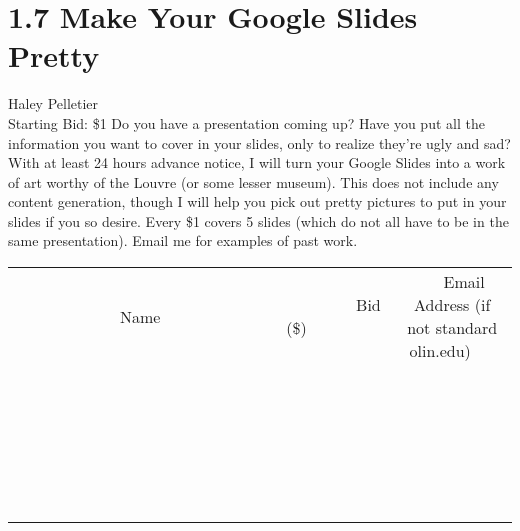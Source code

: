 \documentclass[11pt]{article}
\begin{document}
\section*{1.7 Make Your Google Slides Pretty}
Haley Pelletier
\\
Starting Bid: \$1
\newline
Do you have a presentation coming up? Have you put all the information you want to cover in your slides, only to realize they're ugly and sad? With at least 24 hours advance notice, I will turn your Google Slides into a work of art worthy of the Louvre (or some lesser museum). This does not include any content generation, though I will help you pick out pretty pictures to put in your slides if you so desire. Every \$1 covers 5 slides (which do not all have to be in the same presentation). Email me for examples of past work.
\\[6ex]
\begin{tabular}{c c c}
~~~~~~~~~~~~~Name~~~~~~~~~~~~~ & ~~~~~~~~~Bid (\$)~~~~~~~~~  & ~~~Email Address (if not standard olin.edu)~~~\\
 & & \\
\hline
 & & \\
\hline
 & & \\
\hline
 & & \\
\hline
 & & \\
\hline
 & & \\
\hline
 & & \\
\hline
 & & \\
\hline
 & & \\
\hline
 & & \\
\hline
 & & \\
\hline
 & & \\
\hline
 & & \\
\hline
 & & \\
\hline
 & & \\
\hline
 & & \\
\hline
 & & \\
\hline
 & & \\
\hline
 & & \\
\hline
 & & \\
\hline
 & & \\
\hline
 & & \\
\hline
 & & \\
\hline
 & & \\
\hline
 & & \\
\hline
 & & \\
\hline
\end{tabular}
\newpage
\end{document}
